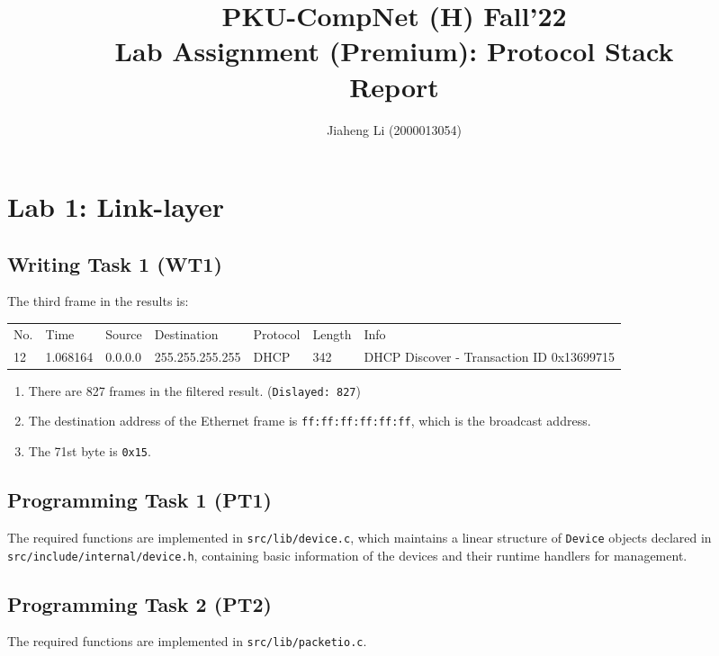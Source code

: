 \documentclass[a4paper]{article}
\title{PKU-CompNet (H) Fall'22 \\ Lab Assignment (Premium): Protocol Stack \\ Report}
\author{Jiaheng Li (2000013054)}
\begin{document}
  \maketitle

  \section{Lab 1: Link-layer}

  \subsection{Writing Task 1 (WT1)}

  The third frame in the results is:
  \begin{table}[!ht]
    \centering
    \fontsize{8pt}{8pt}
    \ttfamily
    \begin{tabular}{lllllll}
      No. & Time & Source & Destination & Protocol & Length & Info \\
      12 & 1.068164 & 0.0.0.0 & 255.255.255.255 & DHCP & 342 & DHCP Discover - Transaction ID 0x13699715
    \end{tabular}
  \end{table}

  \begin{enumerate}
    \item There are 827 frames in the filtered result. (\texttt{Dislayed: 827})
    \item The destination address of the Ethernet frame is \texttt{ff:ff:ff:ff:ff:ff}, which is the broadcast address.
    \item The 71st byte is \texttt{0x15}.
  \end{enumerate}

  \subsection{Programming Task 1 (PT1)}

  The required functions are implemented in \texttt{src/lib/device.c}, which maintains a linear structure of \texttt{Device} objects declared in \texttt{src/include/internal/device.h}, containing basic information of the devices and their runtime handlers for management.

  \subsection{Programming Task 2 (PT2)}

  The required functions are implemented in \texttt{src/lib/packetio.c}.
\end{document}

